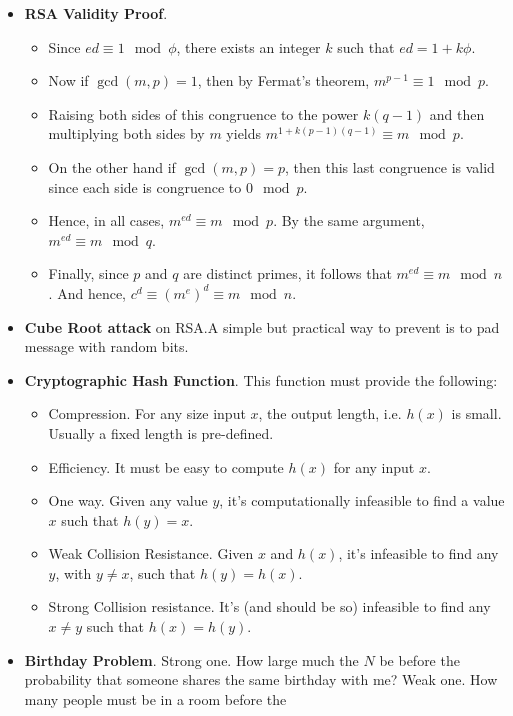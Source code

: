 \documentclass[twocolumn]{article}
\begin{document}
\begin{itemize}
\begin{algorithm}
  \end{algorithm}
\item \textbf{RSA Validity Proof}.
  \begin{itemize}
  \item Since $ed\equiv 1\mod\phi$, there exists an integer $k$ such
    that $ed=1+k\phi$. 
  \item Now if $\gcd(m,p)=1$, then by Fermat's theorem, $m^{p-1}\equiv
    1\mod p$. 
  \item Raising both sides of this congruence to the power $k(q-1)$
    and then multiplying both sides by $m$ yields
    $m^{1+k(p-1)(q-1)}\equiv m\mod p$.
  \item On the other hand if $\gcd(m,p)=p$, then this last congruence
    is valid since each side is congruence to $0\mod p$. 
  \item Hence, in all cases, $m^{ed}\equiv m\mod p$. By the same
    argument, $m^{ed}\equiv m\mod q$. 
  \item Finally, since $p$ and $q$ are distinct primes, it follows
    that $m^{ed}\equiv m\mod n$. And hence, $c^{d}\equiv
    {(m^{e})}^{d}\equiv m\mod n$.
  \end{itemize}
\item \textbf{Cube Root attack} on RSA.\@ A simple but practical way to
  prevent is to pad message with random bits.
\item \textbf{Cryptographic Hash Function}. This function must provide
  the following:
  \begin{itemize}
  \item Compression. For any size input $x$, the output length,
    i.e. $h(x)$ is small. Usually a fixed length is pre-defined.
  \item Efficiency. It must be easy to compute $h(x)$ for any input
    $x$. 
  \item One way. Given any value $y$, it's computationally infeasible
    to find a value $x$ such that $h(y)=x$.
  \item Weak Collision Resistance. Given $x$ and $h(x)$, it's
    infeasible to find any $y$, with $y\neq x$, such that
    $h(y)=h(x)$.
  \item Strong Collision resistance. It's (and should be so)
    infeasible to find any $x\neq y$ such that $h(x)=h(y)$.
  \end{itemize}
\item \textbf{Birthday Problem}. Strong one. How large much the $N$ be
  before the probability that someone shares the same birthday with
  me? Weak one. How many people must be in a room before the

\end{itemize}
\end{document}
